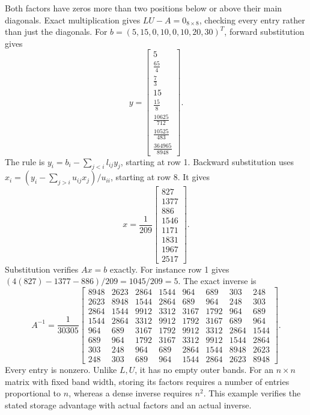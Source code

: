 Both factors have zeros more than two positions below or above their
main diagonals. Exact multiplication gives $LU-A=0_{8\times8}$,
checking every entry rather than just the diagonals.
For $b=(5,15,0,10,0,10,20,30)^T$, forward substitution gives
\[y=\left[\begin{matrix}5\\\frac{65}{4}\\\frac{7}{3}\\15\\\frac{15}{8}\\\frac{10625}{712}\\\frac{10525}{483}\\\frac{364965}{8948}\end{matrix}\right].\]
The rule is $y_i=b_i-\sum_{j<i}l_{ij}y_j$, starting at row 1.
Backward substitution uses
$x_i=(y_i-\sum_{j>i}u_{ij}x_j)/u_{ii}$, starting at row 8.
It gives
\[x=\frac1{209}\begin{bmatrix}827\\1377\\886\\1546\\1171\\1831\\1967\\2517\end{bmatrix}.
\]
Substitution verifies $Ax=b$ exactly. For instance row 1 gives
$(4(827)-1377-886)/209=1045/209=5$.
The exact inverse is
\[A^{-1}=\frac1{30305}\left[\begin{matrix}8948 & 2623 & 2864 & 1544 & 964 & 689 & 303 & 248\\2623 & 8948 & 1544 & 2864 & 689 & 964 & 248 & 303\\2864 & 1544 & 9912 & 3312 & 3167 & 1792 & 964 & 689\\1544 & 2864 & 3312 & 9912 & 1792 & 3167 & 689 & 964\\964 & 689 & 3167 & 1792 & 9912 & 3312 & 2864 & 1544\\689 & 964 & 1792 & 3167 & 3312 & 9912 & 1544 & 2864\\303 & 248 & 964 & 689 & 2864 & 1544 & 8948 & 2623\\248 & 303 & 689 & 964 & 1544 & 2864 & 2623 & 8948\end{matrix}\right].\]
Every entry is nonzero. Unlike $L,U$, it has no empty outer bands.
For an $n\times n$ matrix with fixed band width, storing its factors
requires a number of entries proportional to $n$, whereas a dense
inverse requires $n^2$. This example verifies the stated storage
advantage with actual factors and an actual inverse.

